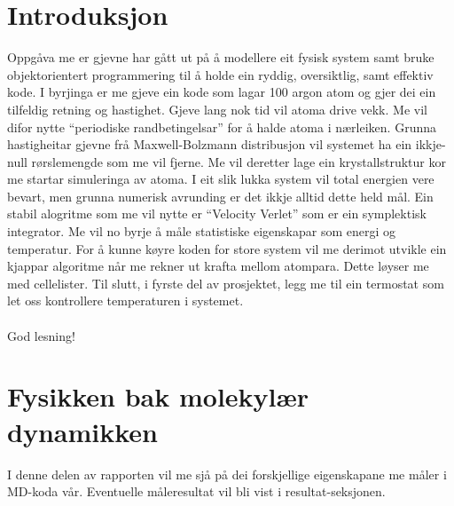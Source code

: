 \documentclass[12pt, a4paper]{article}
\theoremstyle{definition}
\begin{document}
\newpage
    \tableofcontents
\newpage

\section*{Introduksjon}
    Oppgåva me er gjevne har gått ut på å modellere eit fysisk system samt bruke objektorientert programmering til å holde ein ryddig, oversiktlig, samt effektiv kode. 
    I byrjinga er me gjeve ein kode som lagar 100 argon atom og gjer dei ein tilfeldig retning og hastighet. Gjeve lang nok tid vil atoma drive vekk. Me vil difor nytte
    ``periodiske randbetingelsar'' for å halde atoma i nærleiken. Grunna hastigheitar gjevne frå Maxwell-Bolzmann distribusjon vil systemet ha ein ikkje-null
    rørslemengde som me vil fjerne. Me vil deretter lage ein krystallstruktur kor me startar simuleringa av atoma. I eit slik lukka system vil total energien vere bevart, 
    men grunna numerisk avrunding er det ikkje alltid dette held mål. Ein stabil alogritme som me vil nytte er ``Velocity Verlet'' som er ein symplektisk integrator. %
    Me vil no byrje å måle statistiske eigenskapar som energi og temperatur. For å kunne køyre koden for store system vil me derimot utvikle ein kjappar algoritme når 
    me rekner ut krafta mellom atompara. Dette løyser me med cellelister. Til slutt, i fyrste del av prosjektet, legg me til ein termostat som let oss kontrollere 
    temperaturen i systemet. \\ \\
    God lesning!



\newpage


\section*{Fysikken bak molekylær dynamikken}
    I denne delen av rapporten vil me sjå på dei forskjellige eigenskapane me måler i MD-koda vår. Eventuelle måleresultat vil bli vist i resultat-seksjonen.
\end{document}
